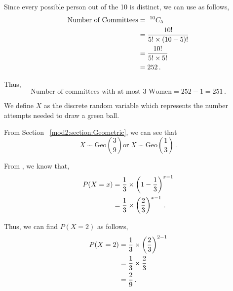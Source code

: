 \begin{subquestions}
Since every possible person out of the 10 is distinct, we can use  as follows,
\begin{align}
	\text{Number of Committees} & = ~ ^{10}C_5 \nonumber \\
	                            & = \frac{10!}{5!\times (10-5)!} \nonumber \\
	                            & = \frac{10!}{5! \times 5!} \nonumber \\
	                            & = 252 \,.
\end{align}

Thus,
\begin{equation}
	\text{Number of committees with at most 3 Women} = 252 - 1 = 251 \,.
\end{equation}


\subquestion

We define $X$ as the discrete random variable which represents the number attempts needed to draw a green ball.

\begin{subsubquestions}
	
\subsubquestion

From Section ~\ref{mod2:section:Geometric}, we can see that
\begin{equation}
	X \sim \text{Geo} \left(\frac{3}{9}\right) \text{or} ~ X \sim \text{Geo} \left(\frac{1}{3}\right) \,.
\end{equation}


\subsubquestion

\begin{subsubsubquestions}
	
\subsubsubquestion

From , we know that,
\begin{align}
	P(X = x) & = \frac{1}{3} \times \left(1-\frac{1}{3} \right)^{x-1} \nonumber \\
	         & = \frac{1}{3} \times \left(\frac{2}{3} \right)^{x-1} \,.
\end{align}	
	
Thus, we can find $P(X=2)$ as follows,
\begin{align}
	P(X=2) & = \frac{1}{3} \times \left(\frac{2}{3} \right)^{2-1} \nonumber \\
	       & = \frac{1}{3} \times \frac{2}{3}  \nonumber \\
	       & = \frac{2}{9} \,.
\end{align}


\end{subsubsubquestions}
\end{subsubquestions}
\end{subquestions}
